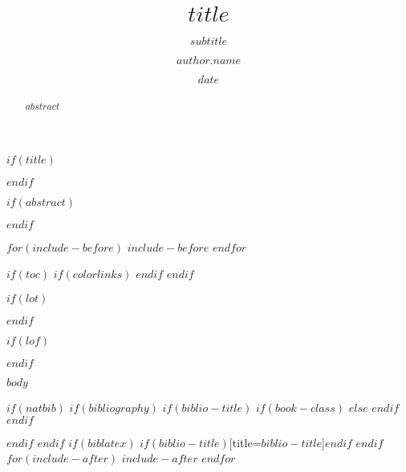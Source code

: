 \documentclass[
$if(papersize)$
  $papersize$paper,
$endif$
$if(fontsize)$
  $fontsize$,
$endif$
$for(classoption)$$classoption$$sep$,$endfor$%
]{scrartcl}
\title{$title$}
\subtitle{$subtitle$}
\author[$author.id$]{$author.name$}
\affil[$affil.id$]{$affil.name$}
\date{$date$}
\begin{document}
$if(title)$
\maketitle
$endif$

$if(abstract)$
\begin{abstract}
$abstract$
\end{abstract}
$endif$

$for(include-before)$
$include-before$
$endfor$

$if(toc)$
$if(colorlinks)$
\hypersetup{linkcolor=$if(toccolor)$$toccolor$$else$black$endif$}
$endif$
\setcounter{tocdepth}{$toc-depth$}
\tableofcontents
$endif$

$if(lot)$
\listoftables
$endif$

$if(lof)$
\listoffigures
$endif$

$body$

$if(natbib)$
$if(bibliography)$
$if(biblio-title)$
$if(book-class)$
\renewcommand\bibname{$biblio-title$}
$else$
\renewcommand\refname{$biblio-title$}
$endif$
$endif$

$endif$
$endif$
$if(biblatex)$
\printbibliography$if(biblio-title)$[title=$biblio-title$]$endif$
$endif$
$for(include-after)$
$include-after$
$endfor$
\end{document}
